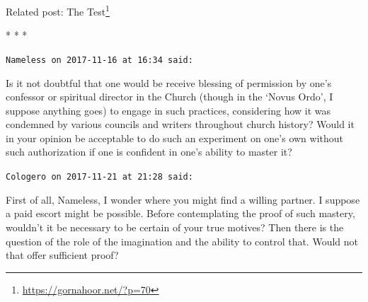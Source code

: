 Related post: The Test\footnote{\url{https://gornahoor.net/?p=70}}



\begin{center}* * *\end{center}

\begin{footnotesize}
\begin{sffamily}
\texttt{Nameless on 2017-11-16 at 16:34 said:}

Is it not doubtful that one would be receive blessing of permission by one's confessor or spiritual director in the Church (though in the `Novus Ordo', I suppose anything goes) to engage in such practices, considering how it was condemned by various councils and writers throughout church history? Would it in your opinion be acceptable to do such an experiment on one's own without such authorization if one is confident in one's ability to master it?

\hfill

\texttt{Cologero on 2017-11-21 at 21:28 said:}

First of all, Nameless, I wonder where you might find a willing partner. I suppose a paid escort might be possible. Before contemplating the proof of such mastery, wouldn't it be necessary to be certain of your true motives? Then there is the question of the role of the imagination and the ability to control that. Would not that offer sufficient proof?


\hfill

\end{sffamily}
\end{footnotesize}

